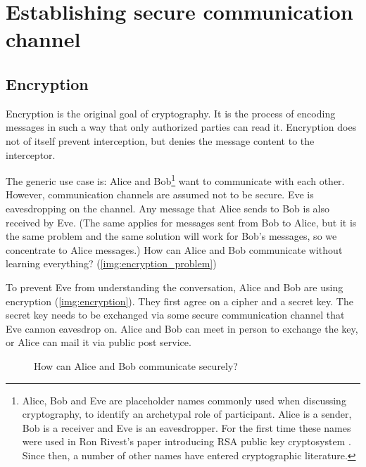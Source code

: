 \chapter{Establishing secure communication channel}

\section{Encryption}

Encryption is the original goal of cryptography. It is the process of encoding messages in such a way that only authorized parties can read it. Encryption does not of itself prevent interception, but denies the message content to the interceptor.

The generic use case is: Alice and Bob\footnote{Alice, Bob and Eve are placeholder names commonly used when discussing cryptography, to identify an archetypal role of participant. Alice is a sender, Bob is a receiver and Eve is an eavesdropper. For the first time these names were used in Ron Rivest's paper introducing RSA public key cryptosystem . Since then, a number of other names have entered cryptographic literature.} want to communicate with each other. However, communication channels are assumed not to be secure. Eve is eavesdropping on the channel. Any message that Alice sends to Bob is also received by Eve. (The same applies for messages sent from Bob to Alice, but it is the same problem and the same solution will work for Bob's messages, so we concentrate to Alice messages.) How can Alice and Bob communicate without learning everything? (\autoref{img:encryption_problem}) \cite[p.~23]{ferguson2010cryptography}

To prevent Eve from understanding the conversation, Alice and Bob are using encryption (\autoref{img:encryption}). They first agree on a cipher and a secret key. The secret key needs to be exchanged via some secure communication channel that Eve cannon eavesdrop on. Alice and Bob can meet in person to exchange the key, or Alice can mail it via public post service.

\begin{figure}
  \centering
  \caption{How can Alice and Bob communicate securely?}
  \label{img:encryption_problem}
\end{figure}


